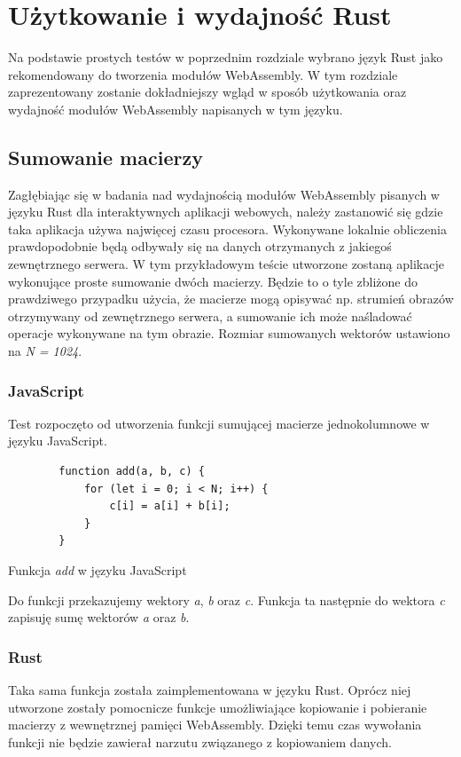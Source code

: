 \documentclass[language=polish,type=master]{aghmodern}
\begin{document}
\chapter{Użytkowanie i wydajność Rust}
Na podstawie prostych testów w poprzednim rozdziale wybrano język Rust jako rekomendowany do tworzenia modułów WebAssembly.
W tym rozdziale zaprezentowany zostanie dokładniejszy wgląd w sposób użytkowania oraz wydajność modułów WebAssembly napisanych w tym języku.

\section{Sumowanie macierzy}
Zagłębiając się w badania nad wydajnością modułów WebAssembly pisanych w języku Rust dla interaktywnych aplikacji webowych, należy zastanowić się gdzie taka aplikacja używa najwięcej czasu procesora.
Wykonywane lokalnie obliczenia prawdopodobnie będą odbywały się na danych otrzymanych z jakiegoś zewnętrznego serwera.
W tym przykładowym teście utworzone zostaną aplikacje wykonujące proste sumowanie dwóch macierzy.
Będzie to o tyle zbliżone do prawdziwego przypadku użycia, że macierze mogą opisywać np. strumień obrazów otrzymywany od zewnętrznego serwera, a sumowanie ich może naśladować operacje wykonywane na tym obrazie.
Rozmiar sumowanych wektorów ustawiono na \emph{N = 1024}.

\subsection{JavaScript}
Test rozpoczęto od utworzenia funkcji sumującej macierze jednokolumnowe w języku JavaScript.

\begin{listing}[H]
    \begin{verbatim}
        function add(a, b, c) {
            for (let i = 0; i < N; i++) {
                c[i] = a[i] + b[i];
            }
        }
    \end{verbatim}
    \caption{Funkcja \emph{add} w języku JavaScript}
\end{listing}

Do funkcji przekazujemy wektory \emph{a}, \emph{b} oraz \emph{c}.
Funkcja ta następnie do wektora \emph{c} zapisuję sumę wektorów \emph{a} oraz \emph{b}.

\subsection{Rust}
Taka sama funkcja została zaimplementowana w języku Rust.
Oprócz niej utworzone zostały pomocnicze funkcje umożliwiające kopiowanie i pobieranie macierzy z wewnętrznej pamięci WebAssembly.
Dzięki temu czas wywołania funkcji nie będzie zawierał narzutu związanego z kopiowaniem danych.
\end{document}
